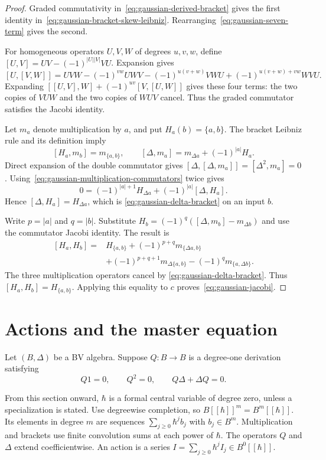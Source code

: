 \begin{proof}
Graded commutativity in~\eqref{eq:gaussian-derived-bracket} gives the
first identity in~\eqref{eq:gaussian-bracket-skew-leibniz}.
Rearranging~\eqref{eq:gaussian-seven-term} gives the second.

For homogeneous operators $U,V,W$ of degrees $u,v,w$, define
$[U,V]=UV-(-1)^{|U||V|}VU$.
Expansion gives
\[
 [U,[V,W]]
 =UVW-(-1)^{vw}UWV-(-1)^{u(v+w)}VWU
       +(-1)^{u(v+w)+vw}WVU.
\]
Expanding $[[U,V],W]+(-1)^{uv}[V,[U,W]]$ gives these four terms:
the two copies of $VUW$ and the two copies of $WUV$ cancel.
Thus the graded commutator satisfies the Jacobi identity.

Let $m_a$ denote multiplication by $a$, and put $H_a(b)=\{a,b\}$.
The bracket Leibniz rule and its definition imply
\begin{equation}\label{eq:gaussian-multiplication-commutators}
 [H_a,m_b]=m_{\{a,b\}},
 \qquad [\Delta,m_a]=m_{\Delta a}+(-1)^{|a|}H_a.
\end{equation}
Direct expansion of the double commutator gives
$[\Delta,[\Delta,m_a]]=[\Delta^2,m_a]=0$.
Using~\eqref{eq:gaussian-multiplication-commutators} twice gives
\[
 0=(-1)^{|a|+1}H_{\Delta a}+(-1)^{|a|}[\Delta,H_a].
\]
Hence $[\Delta,H_a]=H_{\Delta a}$, which is
\eqref{eq:gaussian-delta-bracket} on an input $b$.

Write $p=|a|$ and $q=|b|$.
Substitute $H_b=(-1)^q([\Delta,m_b]-m_{\Delta b})$ and use
the commutator Jacobi identity. The result is
\[
 \begin{split}
 [H_a,H_b]={}&H_{\{a,b\}}
  +(-1)^{p+q}m_{\{\Delta a,b\}}\\
 &+(-1)^{p+q+1}m_{\Delta\{a,b\}}
  -(-1)^q m_{\{a,\Delta b\}}.
 \end{split}
\]
The three multiplication operators cancel by
\eqref{eq:gaussian-delta-bracket}.
Thus $[H_a,H_b]=H_{\{a,b\}}$.
Applying this equality to $c$ proves~\eqref{eq:gaussian-jacobi}.
\end{proof}

\section{Actions and the master equation}
\label{sec:gaussian-master-equation}

Let $(B,\Delta)$ be a BV algebra.
Suppose $Q:B\to B$ is a degree-one derivation satisfying
\[
 Q1=0,\qquad Q^2=0,\qquad Q\Delta+\Delta Q=0.
\]

From this section onward, $\hbar$ is a formal central variable of degree
zero, unless a specialization is stated.
Use degreewise completion, so $B[[\hbar]]^m=B^m[[\hbar]]$.
Its elements in degree $m$ are sequences
$\sum_{j\geq0}\hbar^j b_j$ with $b_j\in B^m$.
Multiplication and brackets use finite convolution sums at each power
of $\hbar$. The operators $Q$ and $\Delta$ extend coefficientwise.
An action is a series
$I=\sum_{j\geq0}\hbar^jI_j\in B^0[[\hbar]]$.

